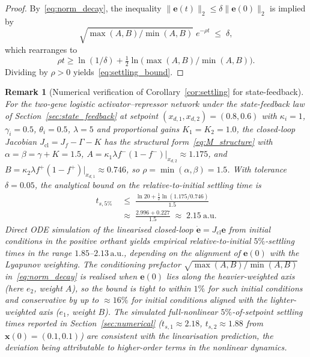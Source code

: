 \documentclass[12pt]{article}
\newtheorem{remark}{Remark}
\begin{document}
\begin{proof}
By~\eqref{eq:norm_decay}, the inequality
$\|\mathbf{e}(t)\|_2\leq\delta\|\mathbf{e}(0)\|_2$ is implied by
\[
\sqrt{\max(A,B)/\min(A,B)}\;e^{-\rho t}\;\leq\;\delta,
\]
which rearranges to
\[
\rho t \geq \ln(1/\delta) + \tfrac{1}{2}\ln\bigl(\max(A,B)/\min(A,B)\bigr).
\]
Dividing by $\rho>0$ yields~\eqref{eq:settling_bound}.
\end{proof}

\begin{remark}[Numerical verification of Corollary~\ref{cor:settling} for state-feedback]
\label{rem:lyapunov_numerical}
For the two-gene logistic activator--repressor network under the state-feedback
law of Section~\ref{sec:state_feedback} at setpoint $(x_{d,1},x_{d,2})=(0.8,0.6)$
with $\kappa_i=1$, $\gamma_i=0.5$, $\theta_i=0.5$, $\lambda=5$ and proportional
gains $K_1=K_2=1.0$, the closed-loop Jacobian
$J_{\mathrm{cl}}=J_f-\Gamma-K$ has the structural form~\eqref{eq:M_structure} with
$\alpha=\beta=\gamma+K=1.5$, $A=\kappa_1\lambda f^-(1-f^-)|_{x_{d,2}}\approx 1.175$,
and $B=\kappa_2\lambda f^+(1-f^+)|_{x_{d,1}}\approx 0.746$, so $\rho=
\min(\alpha,\beta)=1.5$. With tolerance $\delta=0.05$, the analytical bound on
the relative-to-initial settling time is
\[
\begin{aligned}
t_{s,5\%}
&\;\leq\;\frac{\ln 20 + \tfrac{1}{2}\ln(1.175/0.746)}{1.5}\\
&\;\approx\;\frac{2.996+0.227}{1.5}\;\approx\;2.15\ \mathrm{a.u.}
\end{aligned}
\]
Direct ODE simulation of the linearised closed-loop
$\dot{\mathbf{e}}=J_{\mathrm{cl}}\mathbf{e}$ from initial conditions in the
positive orthant yields empirical relative-to-initial $5\%$-settling times in
the range $1.85$--$2.13\,\mathrm{a.u.}$, depending on the alignment of
$\mathbf{e}(0)$ with the Lyapunov weighting. The conditioning prefactor
$\sqrt{\max(A,B)/\min(A,B)}$ in~\eqref{eq:norm_decay} is realised when
$\mathbf{e}(0)$ lies along the \emph{heavier}-weighted axis (here $e_2$, weight
$A$), so the bound is tight to within $1\%$ for such initial conditions and
conservative by up to $\approx 16\%$ for initial conditions aligned with the
\emph{lighter}-weighted axis ($e_1$, weight $B$). The simulated full-nonlinear
$5\%$-of-setpoint settling
times reported in Section~\ref{sec:numerical} ($t_{s,1}\approx 2.18$,
$t_{s,2}\approx 1.88$ from $\mathbf{x}(0)=(0.1,0.1)$) are consistent with the
linearisation prediction, the deviation being attributable to higher-order
terms in the nonlinear dynamics.
\end{remark}
\end{document}
